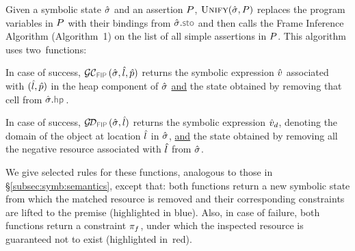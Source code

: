Given a symbolic state $\hat{\sigma}$ and an assertion $P$, $\textsc{Unify}(\hat{\sigma}, P)$ 
 replaces the program variables in $P$ with their bindings 
from $\sstate.\stosel$ and then calls the Frame Inference Algorithm (Algorithm~1) 
 on the list of all simple assertions in $P$. This algorithm uses two~functions: 

\begin{description}
\setlength{\itemsep}{0.2em}
  \item[FIP GetCell.] In case of success, $\GetCellV{\sstate, \sloc, \sexprp}$ returns 
          the symbolic expression $\hat{v}$ associated with 
          $(\hat{l}, \hat{p})$ in the heap component of $\hat{\sigma}$ \underline{and} 
          the state obtained by removing that cell from $\sstate.\hpsel$.
  
  \item[FIP GetDomain.] In case of success, $\GetDomainV{\sstate, \sloc}$ returns 
          the symbolic expression $\hat{v}_d$, denoting the domain 
          of the object at location $\hat{l}$ in $\hat{\sigma}$, \underline{and} 
          the state obtained by removing all the negative resource associated with 
          $\hat{l}$ from $\hat{\sigma}$.  
%  
\end{description}

\noindent We give selected rules for these functions, analogous to those in \S\ref{subsec:symb:semantics}, except that:  both functions return a new symbolic state 
from which the matched resource is removed and  their corresponding constraints are lifted to the premise (highlighted in {\color{blue}blue}). 
Also, in case of failure, both functions return a constraint $\pi_f$, under which the inspected resource is guaranteed not to exist (highlighted in~{\color{red}red}). 

